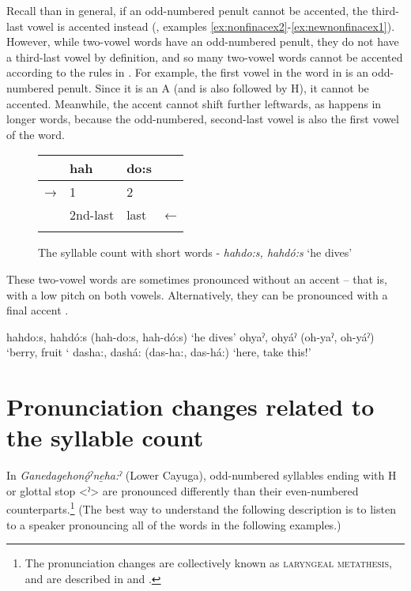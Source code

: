 Recall than in general, if an odd-numbered penult cannot be accented, the third-last vowel is accented instead (, examples \ref{ex:nonfinacex2}-\ref{ex:newnonfinacex1}). However, while two-vowel words have an odd-numbered penult, they do not have a third-last vowel by definition, and so many two-vowel words cannot be accented according to the rules in . For example, the first vowel in the word in  is an odd-numbered penult. Since it is an A (and is also followed by H), it cannot be accented. Meanwhile, the accent cannot shift further leftwards, as happens in longer words, because the odd-numbered, second-last vowel is also the first vowel of the word. 

\begin{figure}
\caption{The syllable count with short words - \textit{hahdo:s, hahdó:s} ‘he dives’}
\label{figtab:1:shortwdsyll}
\begin{tabularx}{\textwidth}{XXXX} 
\lsptoprule
& hah & do:s & \\
\midrule
 → & 1 & 2 & \\
& 2nd-last & last & ←\\
\lspbottomrule
\end{tabularx}
\end{figure}

These two-vowel words are sometimes pronounced without an accent – that is, with a low pitch on both vowels. Alternatively, they can be pronounced with a final accent .

\FloatBarrier
\ea\label{ex:nonfinacex9}
\ea hahdo:s, hahdó:s (hah-do:s, hah-dó:s) ‘he dives’
\ex ohyaˀ, ohyáˀ (oh-yaˀ, oh-yáˀ) ‘berry, fruit ‘
\ex dasha:, dashá: (das-ha:, das-há:) ‘here, take this!’ 
\z
\z 


\section{Pronunciation changes related to the syllable count} \label{ch:Pronunciation changes related to the syllable count}
In \textit{Ganedagehonǫ́ˀne̱ha:ˀ} (Lower Cayuga), odd-numbered syllables ending with H or glottal stop <ˀ> are pronounced differently than their even-numbered counterparts.\footnote{The pronunciation changes are collectively known as \textsc{laryngeal metathesis}, and are described in \citet{foster_alternating_1982} and \citet{doherty_acoustic-phonetic_1993}.} (The best way to understand the following description is to listen to a speaker pronouncing all of the words in the following examples.) 

